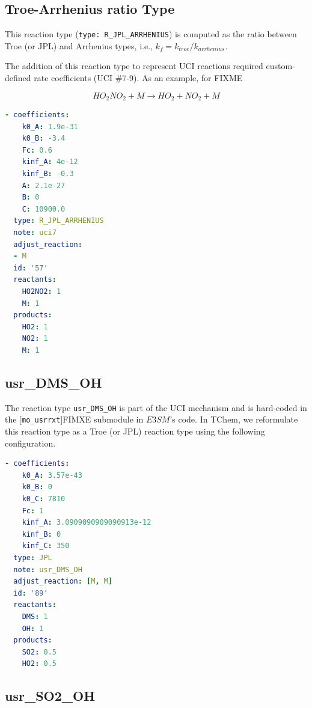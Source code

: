 \documentclass[report, 12pt]{SANDreport}
\newcommand{\eee}{E3SM}
\begin{document}
\subsection{Troe-Arrhenius ratio Type}

This reaction type (\verb|type: R_JPL_ARRHENIUS|) is computed as the ratio between Troe (or JPL) and Arrhenius types, i.e., $k_f=k_{troe}/k_{arrhenius}$.

The addition of this reaction type to represent UCI reactions required custom-defined rate coefficients (UCI \#7-9). As an example, for FIXME%

$$
HO_2NO_2 + M \rightarrow HO_2 + NO_2 + M
$$

\begin{lstlisting}[language=yaml]
- coefficients:
    k0_A: 1.9e-31
    k0_B: -3.4
    Fc: 0.6
    kinf_A: 4e-12
    kinf_B: -0.3
    A: 2.1e-27
    B: 0
    C: 10900.0
  type: R_JPL_ARRHENIUS
  note: uci7
  adjust_reaction:
  - M
  id: '57'
  reactants:
    HO2NO2: 1
    M: 1
  products:
    HO2: 1
    NO2: 1
    M: 1
\end{lstlisting}
\subsection{usr\_DMS\_OH}

The reaction type \verb|usr_DMS_OH| is part of the UCI mechanism and is hard-coded in the [\verb|mo_usrrxt|]FIMXE
submodule in $\eee$'s code. In TChem, we reformulate this reaction type as a Troe (or JPL) reaction type using the following configuration.

\begin{lstlisting}[language=yaml]
- coefficients:
    k0_A: 3.57e-43
    k0_B: 0
    k0_C: 7810
    Fc: 1
    kinf_A: 3.0909090909090913e-12
    kinf_B: 0
    kinf_C: 350
  type: JPL
  note: usr_DMS_OH
  adjust_reaction: [M, M]
  id: '89'
  reactants:
    DMS: 1
    OH: 1
  products:
    SO2: 0.5
    HO2: 0.5
\end{lstlisting}

\subsection{usr\_SO2\_OH}
\end{document}
